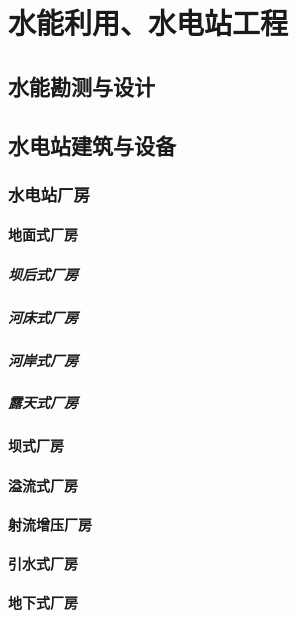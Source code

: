 \documentclass[UTF8]{../../ApplicationUniverse}
\begin{document}
\chapter{水能利用、水电站工程}
\section{水能勘测与设计}
\section{水电站建筑与设备}
    \subsection{水电站厂房}
        \subsubsection{地面式厂房}
            \paragraph{坝后式厂房}
            \paragraph{河床式厂房}
            \paragraph{河岸式厂房}
            \paragraph{露天式厂房}
        \subsubsection{坝式厂房}
        \subsubsection{溢流式厂房}
        \subsubsection{射流增压厂房}
        \subsubsection{引水式厂房}
        \subsubsection{地下式厂房}
\end{document}
